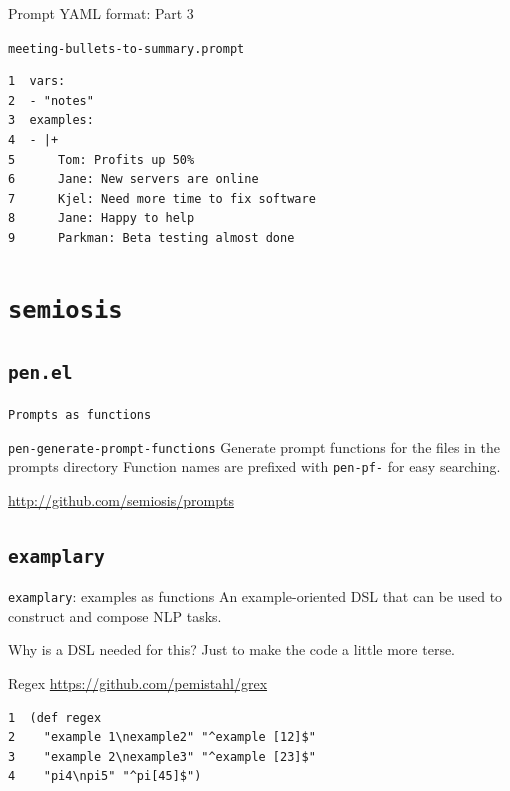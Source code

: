 \documentclass[presentation]{beamer}
\begin{document}
\begin{frame}[label={sec:orgcc39afa},fragile]{Prompt YAML format: Part 3}
 \begin{block}{\texttt{meeting-bullets-to-summary.prompt}}
\begin{verbatim}
1  vars:
2  - "notes"
3  examples:
4  - |+
5      Tom: Profits up 50%
6      Jane: New servers are online
7      Kjel: Need more time to fix software
8      Jane: Happy to help
9      Parkman: Beta testing almost done
\end{verbatim}
\end{block}
\end{frame}

\section{\texttt{semiosis}}
\label{sec:org9b1e794}
\subsection{\texttt{pen.el}}
\label{sec:orgc94e971}
\begin{frame}[label={sec:orge56912f},fragile]{\texttt{Prompts as functions}}
 \begin{block}{\texttt{pen-generate-prompt-functions}}
Generate prompt functions for the files in the
prompts directory Function names are prefixed
with \texttt{pen-pf-} for easy searching.

\url{http://github.com/semiosis/prompts}
\end{block}
\end{frame}

\subsection{\texttt{examplary}}
\label{sec:org2905bb4}
\begin{frame}[label={sec:org02cbdfe},fragile]{\texttt{examplary}: examples as functions}
 An example-oriented DSL that can be used to
construct and compose NLP tasks.

Why is a DSL needed for this? Just to make the
code a little more terse.

\begin{block}{Regex}
\url{https://github.com/pemistahl/grex}

{\footnotesize
\begin{verbatim}
1  (def regex
2    "example 1\nexample2" "^example [12]$"
3    "example 2\nexample3" "^example [23]$"
4    "pi4\npi5" "^pi[45]$")
\end{verbatim}
}
\end{block}
\end{frame}
\end{document}
